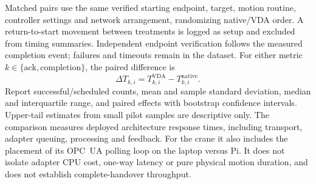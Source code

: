 Matched pairs use the same verified starting endpoint, target, motion routine,
controller settings and network arrangement, randomizing native/VDA order.
A return-to-start movement between treatments is logged as setup and excluded
from timing summaries. Independent endpoint verification follows the measured
completion event; failures and timeouts remain in the dataset. For either
metric $k\in\{\mathrm{ack},\mathrm{completion}\}$, the paired difference is
\begin{equation}
\Delta T_{k,i}=T_{k,i}^{\mathrm{VDA}}-T_{k,i}^{\mathrm{native}}.
\end{equation}
Report successful/scheduled counts, mean and sample standard deviation,
median and interquartile range, and paired effects with bootstrap confidence
intervals. Upper-tail estimates from small pilot samples are descriptive only.
The comparison measures deployed architecture response times, including
transport, adapter queuing, processing and feedback. For the crane it also
includes the placement of its OPC~UA polling loop on the laptop versus Pi.
It does not isolate adapter CPU cost, one-way latency or pure physical motion
duration, and does not establish complete-handover throughput.


